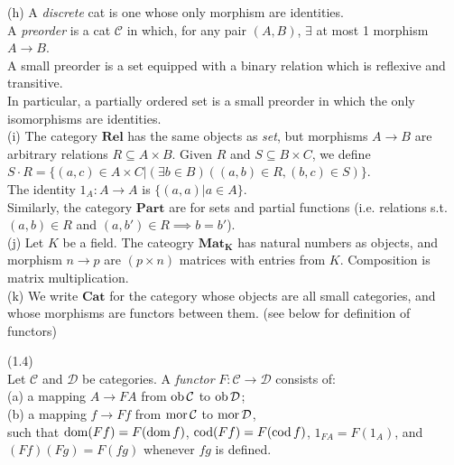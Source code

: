 \documentclass[a4paper]{article}
\begin{document}
\begin{eg}
    (h) A \emph{discrete} cat is one whose only morphism are identities.\\
    A \emph{preorder} is a cat $\mathcal{C}$ in which, for any pair $(A,B)$, $\exists$ at most 1 morphism $A \to B$.\\
    A small preorder is a set equipped with a binary relation which is reflexive and transitive.\\
    In particular, a partially ordered set is a small preorder in which the only isomorphisms are identities.\\
    (i) The category $\mathbf{Rel}$ has the same objects as \emph{set}, but morphisms $A \to B$ are arbitrary relations $R \subseteq A \times B$. Given $R$ and $S \subseteq B\times C$, we define $S \cdot R = \{(a,c) \in A \times C | (\exists b \in B) ((a,b) \in R, (b,c) \in S)\}$.\\
    The identity $1_A:A \to A$ is $\{(a,a) | a \in A\}$.\\
    Similarly, the category $\mathbf{Part}$ are for sets and partial functions (i.e. relations s.t. $(a,b) \in R$ and $(a,b') \in R \implies b = b'$).\\
    (j) Let $K$ be a field. The cateogry $\mathbf{Mat_K}$ has natural numbers as objects, and morphism $n \to p$ are $(p \times n)$ matrices with entries from $K$. Composition is matrix multiplication.\\
    (k) We write $\mathbf{Cat}$ for the category whose objects are all small categories, and whose morphisms are functors between them. (see below for definition of functors)
\end{eg}

\begin{defi} (1.4)\\
    Let $\mathcal{C}$ and $\mathcal{D}$ be categories. A \emph{functor} $F:\mathcal{C} \to \mathcal{D}$ consists of:\\
    (a) a mapping $A \to FA$ from $\operatorname{ob} \mathcal{C}$ to $\operatorname{ob} \mathcal{D}$;\\
    (b) a mapping $f \to Ff$ from $\operatorname{mor} \mathcal{C}$ to $\operatorname{mor} \mathcal{D}$,\\
    such that $\operatorname{dom}(Ff) = F(\operatorname{dom} f)$, $\operatorname{cod}(Ff) = F(\operatorname{cod} f)$, $1_{FA} = F(1_A)$, and $(Ff)(Fg) = F(fg)$ whenever $fg$ is defined.
\end{defi}
\end{document}
